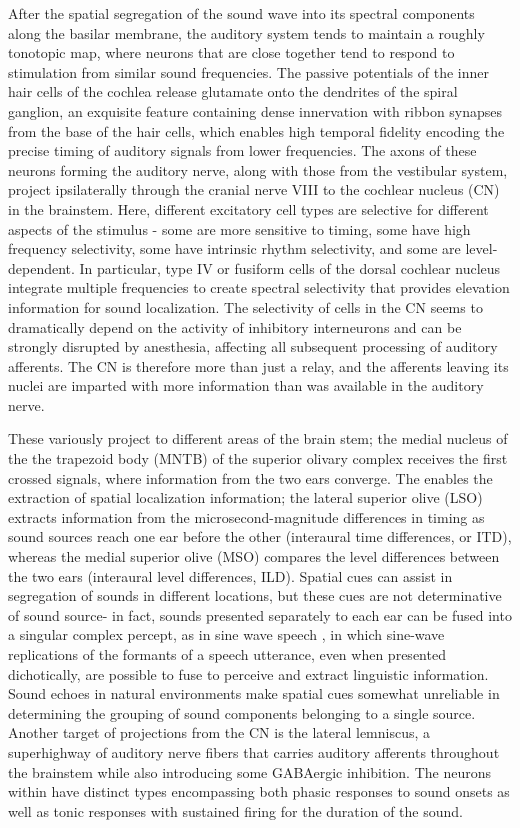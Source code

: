 After the spatial segregation of the sound wave into its spectral components along the basilar membrane, the auditory system tends to maintain a roughly tonotopic map, where neurons that are close together tend to respond to stimulation from similar sound frequencies. The passive potentials of the inner hair cells of the cochlea release glutamate onto the dendrites of the spiral ganglion, an exquisite feature containing dense innervation with ribbon synapses from the base of the hair cells, which enables high temporal fidelity encoding the precise timing of auditory signals from lower frequencies. The axons of these neurons forming the auditory nerve, along with those from the vestibular system, project ipsilaterally through the cranial nerve VIII to the cochlear nucleus (CN) in the brainstem. Here, different excitatory cell types are selective for different aspects of the stimulus - some are more sensitive to timing, some have high frequency selectivity, some have intrinsic rhythm selectivity, and some are level-dependent. In particular, type IV or fusiform cells of the dorsal cochlear nucleus integrate multiple frequencies to create spectral selectivity that provides elevation information for sound localization. The selectivity of cells in the CN seems to dramatically depend on the activity of inhibitory interneurons \cite{evans2013} and can be strongly disrupted by anesthesia, affecting all subsequent processing of auditory afferents. The CN is therefore more than just a relay, and the afferents leaving its nuclei are imparted with more information than was available in the auditory nerve. 

These variously project to different areas of the brain stem; the medial nucleus of the the trapezoid body (MNTB) of the superior olivary complex receives the first crossed signals, where information from the two ears converge. The enables the extraction of spatial localization information; the lateral superior olive (LSO) extracts information from the microsecond-magnitude differences in timing as sound sources reach one ear before the other (interaural time differences, or ITD), whereas the medial superior olive (MSO) compares the level differences between the two ears (interaural level differences, ILD). Spatial cues can assist in segregation of sounds in different locations, but these cues are not determinative of sound source- in fact, sounds presented separately to each ear can be fused into a singular complex percept, as in sine wave speech \cite{Remez1994}, in which sine-wave replications of the formants of a speech utterance, even when presented dichotically, are possible to fuse to perceive and extract linguistic information. Sound echoes in natural environments make spatial cues somewhat unreliable in determining the grouping of sound components belonging to a single source. Another target of projections from the CN is the lateral lemniscus, a superhighway of auditory nerve fibers that carries auditory afferents throughout the brainstem while also introducing some GABAergic inhibition. The neurons within have distinct types encompassing both phasic responses to sound onsets as well as tonic responses with sustained firing for the duration of the sound.

